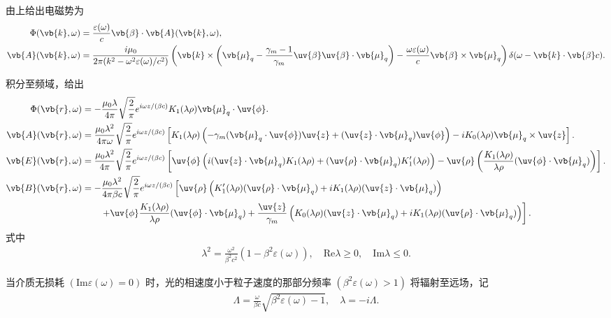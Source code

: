 \begin{exbox}
	由上给出电磁势为
	\begin{align*}
		\Phi(\vb{k}, \omega) &= \frac{\varepsilon(\omega)}{c} \vb{\beta} \cdot \vb{A}(\vb{k}, \omega), \\
		\vb{A}(\vb{k}, \omega) &= \frac{i \mu_{0}}{2\pi (k^{2} - \omega^{2} \varepsilon(\omega)/c^{2})} \left( \vb{k} \times \left( \vb{\mu}_{q} - \frac{\gamma_{m} - 1}{\gamma_{m}} \uv{\beta} \uv{\beta} \cdot \vb{\mu}_{q} \right) - \frac{\omega \varepsilon(\omega)}{c} \vb{\beta} \times \vb{\mu}_{q} \right) \delta(\omega - \vb{k} \cdot \vb{\beta} c).
	\end{align*}

	积分至频域，给出
	\begin{align*}
		\Phi(\vb{r}, \omega) &= -\frac{\mu_{0} \lambda}{4\pi} \sqrt{\frac{2}{\pi}} e^{i\omega z/(\beta c)} K_{1}(\lambda \rho) \vb{\mu}_{q} \cdot \uv{\phi}. \\
		\vb{A}(\vb{r}, \omega) &= \frac{\mu_{0} \lambda^{2}}{4\pi \omega} \sqrt{\frac{2}{\pi}} e^{i\omega z/(\beta c)} \left[ K_{1}(\lambda \rho) \left( -\gamma_{m} (\vb{\mu}_{q} \cdot \uv{\phi}) \uv{z} + (\uv{z} \cdot \vb{\mu}_{q}) \uv{\phi} \right) - i K_{0}(\lambda \rho) \vb{\mu}_{q} \times \uv{z} \right]. \\
		\vb{E}(\vb{r}, \omega) &= \frac{\mu_{0} \lambda^{2}}{4\pi} \sqrt{\frac{2}{\pi}} e^{i\omega z/(\beta c)} \left[ \uv{\phi} \left( i (\uv{z} \cdot \vb{\mu}_{q}) K_{1}(\lambda \rho) + (\uv{\rho} \cdot \vb{\mu}_{q}) K_{1}'(\lambda \rho) \right) - \uv{\rho} \left( \frac{K_{1}(\lambda \rho)}{\lambda \rho} (\uv{\phi} \cdot \vb{\mu}_{q}) \right) \right]. \\
		\vb{B}(\vb{r}, \omega) &= -\frac{\mu_{0} \lambda^{2}}{4\pi \beta c} \sqrt{\frac{2}{\pi}} e^{i\omega z/(\beta c)} \left[ \uv{\rho} \left( K_{1}'(\lambda \rho) (\uv{\rho} \cdot \vb{\mu}_{q}) + i K_{1}(\lambda \rho) (\uv{z} \cdot \vb{\mu}_{q}) \right) \right.\\&\qquad\left.+ \uv{\phi} \frac{K_{1}(\lambda \rho)}{\lambda \rho} (\uv{\phi} \cdot \vb{\mu}_{q}) + \frac{\uv{z}}{\gamma_{m}} \left( K_{0}(\lambda\rho) (\uv{z} \cdot \vb{\mu}_{q}) + i K_{1}(\lambda\rho) (\uv{\rho} \cdot \vb{\mu}_{q}) \right) \right].
	\end{align*}
	式中
	\begin{align*}
		\lambda^{2} = \frac{\omega^{2}}{\beta^{2} c^{2}} (1 - \beta^{2} \varepsilon(\omega)), \quad \mathrm{Re} \lambda \ge 0, \quad \mathrm{Im} \lambda \le 0.
	\end{align*}

	当介质无损耗 \((\mathrm{Im} \varepsilon(\omega) = 0)\) 时，光的相速度小于粒子速度的那部分频率 \((\beta^{2} \varepsilon(\omega) > 1)\) 将辐射至远场，记
	\begin{align*}
		\Lambda = \frac{\omega}{\beta c} \sqrt{\beta^{2} \varepsilon(\omega) - 1}, \quad
		\lambda = -i \Lambda.
	\end{align*}


\end{exbox}

